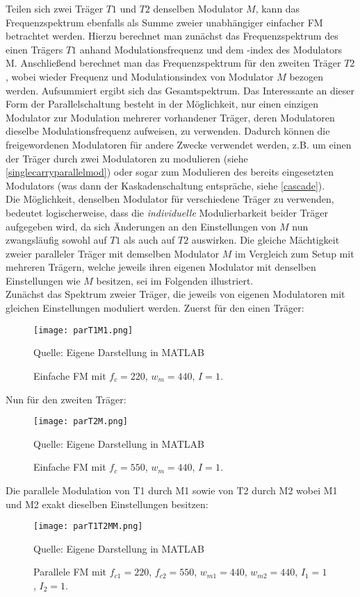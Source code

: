 Teilen sich zwei Träger $T1$ und $T2$ denselben Modulator $M$, kann das Frequenzspektrum ebenfalls als Summe zweier unabhängiger einfacher FM betrachtet werden. Hierzu berechnet man zunächst das Frequenzspektrum des einen Trägers $T1$ anhand Modulationsfrequenz und dem -index des Modulators M. Anschließend berechnet man das Frequenzspektrum für den zweiten Träger $T2$, wobei wieder Frequenz und Modulationsindex von Modulator $M$ bezogen werden. Aufsummiert ergibt sich das Gesamtspektrum. Das Interessante an dieser Form der Parallelschaltung besteht in der Möglichkeit, nur einen einzigen Modulator zur Modulation mehrerer vorhandener Träger, deren Modulatoren dieselbe Modulationsfrequenz aufweisen, zu verwenden. Dadurch können die freigewordenen Modulatoren für andere Zwecke verwendet werden, z.B. um einen der Träger durch zwei Modulatoren zu modulieren (siehe \ref{singlecarryparallelmod}) oder sogar zum Modulieren des bereits eingesetzten Modulators (was dann der Kaskadenschaltung entspräche, siehe \ref{cascade}).  \\
Die Möglichkeit, denselben Modulator für verschiedene Träger zu verwenden, bedeutet logischerweise, dass die \textit{individuelle} Modulierbarkeit beider Träger aufgegeben wird, da sich Änderungen an den Einstellungen von $M$ nun zwangsläufig sowohl auf $T1$ als auch auf $T2$ auswirken. Die gleiche Mächtigkeit zweier paralleler Träger mit demselben Modulator $M$ im Vergleich zum Setup mit mehreren Trägern, welche jeweils ihren eigenen Modulator mit denselben Einstellungen wie $M$ besitzen, sei im Folgenden illustriert. \\
Zunächst das Spektrum zweier Träger, die jeweils von eigenen Modulatoren mit gleichen Einstellungen moduliert werden. Zuerst für den einen Träger:
\FloatBarrier
\begin{figure} [ht]
\centering
  \texttt{[image: parT1M1.png]}
\caption{Einfache FM mit $f_c = 220$, $w_m = 440$, $I = 1$. }
Quelle: Eigene Darstellung in MATLAB
\end{figure}
\FloatBarrier
Nun für den zweiten Träger:
\FloatBarrier
\begin{figure} [ht]
\centering
  \texttt{[image: parT2M.png]}
\caption{Einfache FM mit $f_c = 550$, $w_m = 440$, $I = 1$. }
Quelle: Eigene Darstellung in MATLAB
\end{figure}
\FloatBarrier
Die parallele Modulation von T1 durch M1 sowie von T2 durch M2 wobei M1 und M2 exakt dieselben Einstellungen besitzen:
\FloatBarrier
\begin{figure} [ht]
\centering
  \texttt{[image: parT1T2MM.png]}
\caption{Parallele FM mit $f_{c1} = 220$, $f_{c2} = 550$, $w_{m1} = 440$, $w_{m2} = 440$, $I_1 = 1$, $I_2 = 1$. }
Quelle: Eigene Darstellung in MATLAB
\end{figure}
